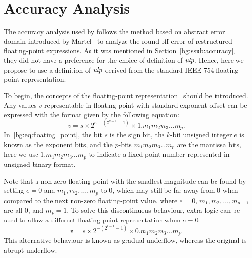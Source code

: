 \section{Accuracy Analysis}
\label{so:sec:accuracy}

The accuracy analysis used by \soap{} follows the method based on abstract
error domain introduced by Martel~\cite{martel07} to analyze the round-off
error of restructured floating-point expressions.  As it was mentioned in
Section~\ref{bg:ssub:accuracy}, they did not have a preference for the choice
of definition of $\operatorname{\mathit{ulp}}$.  Hence, here we propose to use a definition of $\operatorname{\mathit{ulp}}$
derived from the standard IEEE 754 floating-point representation.

To begin, the concepts of the floating-point representation~\cite{ieee754}
should be introduced.  Any values $v$ representable in floating-point with
standard exponent offset can be expressed with the format given by the
following equation:
\begin{equation}
    v = s \times 2^{e - (2^{k - 1} - 1)} \times 1.{m_1 m_2 m_3 \ldots m_p}.
    \label{bg:eq:floating_point}
\end{equation}
In~\eqref{bg:eq:floating_point}, the bit $s$ is the sign bit, the $k$-bit
unsigned integer $e$ is known as the exponent bits, and the $p$-bits $m_1 m_2
m_3 \ldots m_p$ are the mantissa bits, here we use $1.{m_1 m_2 m_3 \ldots m_p}$
to indicate a fixed-point number represented in unsigned binary format.

Note that a non-zero floating-point with the smallest magnitude can be found
by setting $e = 0$ and $m_1, m_2, \ldots, m_p$ to $0$, which may still be far
away from $0$ when compared to the next non-zero floating-point value, where
$e = 0$, $m_1, m_2, \ldots, m_{p-1}$ are all $0$, and $m_p = 1$.  To solve
this discontinuous behaviour, extra logic can be used to allow a different
floating-point representation when $e = 0$:
\begin{equation}
    v = s \times 2^{-(2^{k-1} - 1)} \times 0.{m_1 m_2 m_3 \ldots m_p}.
\end{equation}
This alternative behaviour is known as gradual underflow, whereas the original
is abrupt underflow.

